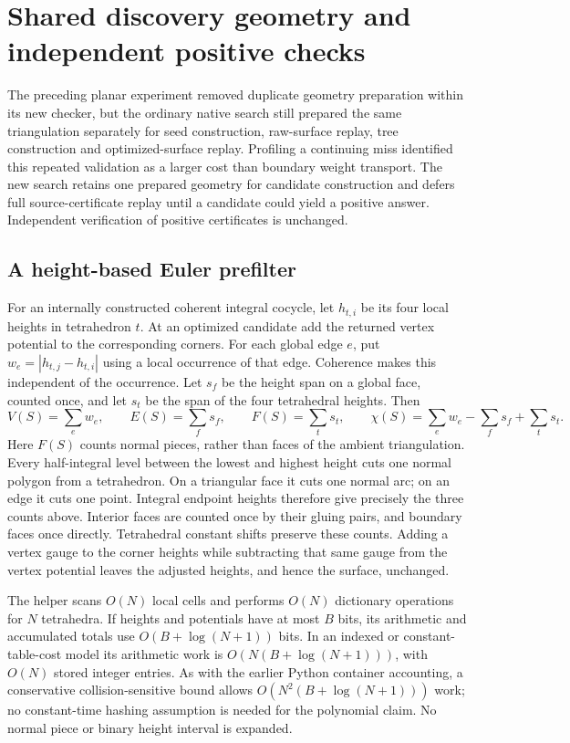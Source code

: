 \section{Shared discovery geometry and independent positive checks}
\label{sec:cocycle-reuse}

The preceding planar experiment removed duplicate geometry preparation
within its new checker, but the ordinary native search still prepared the
same triangulation separately for seed construction, raw-surface replay,
tree construction and optimized-surface replay. Profiling a continuing
miss identified this repeated validation as a larger cost than boundary
weight transport. The new search retains one prepared geometry for
candidate construction and defers full source-certificate replay until a
candidate could yield a positive answer. Independent verification of
positive certificates is unchanged.

\subsection{A height-based Euler prefilter}

For an internally constructed coherent integral cocycle, let $h_{t,i}$ be
its four local heights in tetrahedron $t$. At an optimized candidate add
the returned vertex potential to the corresponding corners. For each
global edge $e$, put $w_e=|h_{t,j}-h_{t,i}|$ using a local occurrence of
that edge. Coherence makes this independent of the occurrence. Let
$s_f$ be the height span on a global face, counted once, and let $s_t$ be
the span of the four tetrahedral heights. Then
\[
  V(S)=\sum_e w_e,\qquad E(S)=\sum_f s_f,\qquad
  F(S)=\sum_t s_t,\qquad
  \chi(S)=\sum_e w_e-\sum_f s_f+\sum_t s_t.
\]
Here $F(S)$ counts normal pieces, rather than faces of the ambient
triangulation. Every half-integral level between the lowest and highest
height cuts one normal polygon from a tetrahedron. On a triangular face
it cuts one normal arc; on an edge it cuts one point. Integral endpoint
heights therefore give precisely the three counts above. Interior faces
are counted once by their gluing pairs, and boundary faces once directly.
Tetrahedral constant shifts preserve these counts. Adding a vertex gauge
to the corner heights while subtracting that same gauge from the vertex
potential leaves the adjusted heights, and hence the surface, unchanged.

The helper scans $O(N)$ local cells and performs $O(N)$ dictionary
operations for $N$ tetrahedra. If heights and potentials have at most $B$
bits, its arithmetic and accumulated totals use $O(B+\log(N+1))$ bits.
In an indexed or constant-table-cost model its arithmetic work is
$O(N(B+\log(N+1)))$, with $O(N)$ stored integer entries. As with the earlier
Python container accounting, a conservative collision-sensitive bound
allows $O(N^2(B+\log(N+1)))$ work; no constant-time hashing assumption is
needed for the polynomial claim. No normal piece or binary height interval
is expanded.

